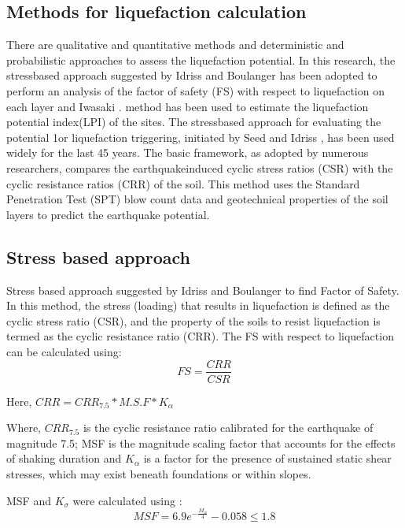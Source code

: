 \subsection{Methods for liquefaction calculation}
There are qualitative and quantitative methods and deterministic and probabilistic approaches to assess the liquefaction potential. In this research, the stress\-based approach suggested by Idriss and Boulanger\cite{idris_and_bolinger} has been adopted to perform an analysis of the factor of safety (FS) with respect to liquefaction on each layer and Iwasaki . \cite{r26} method has been used to estimate the liquefaction potential index(LPI) of the sites.
The stress\-based approach for evaluating the potential 1\-or liquefaction triggering, initiated by Seed and Idriss \cite{idris_seed}, has been used widely for the last 45 years. The basic framework, as adopted by numerous researchers, compares the earthquake\-induced cyclic stress ratios (CSR) with the cyclic resistance ratios (CRR) of the soil. This method uses the Standard Penetration Test (SPT) blow count data and geotechnical properties of the soil layers to predict the earthquake potential.
\subsection{Stress based approach}
Stress based approach suggested by Idriss and Boulanger \cite{idris_and_bolinger} to find Factor of Safety. In this method, the stress (loading) that results in liquefaction is defined as the cyclic stress ratio (CSR), and the property of the soils to resist liquefaction is termed as the cyclic resistance ratio (CRR). The FS with respect to liquefaction can be calculated using:
\begin{equation}
FS = \frac{CRR}{CSR}
\end{equation}

Here, $CRR = CRR_{7.5}*M.S.F*K_\alpha $

Where, $CRR_{7.5}$ is the cyclic resistance ratio calibrated for the earthquake of magnitude 7.5; MSF is the magnitude scaling factor that accounts for the effects of shaking duration and $K_\alpha$ is a factor for the presence of sustained static shear stresses, which may exist beneath foundations or within slopes.

MSF and $K_\sigma$ were calculated using \cite{idris_and_bolinger}: 
\begin{equation}
MSF = 6.9 e^{- \frac{M_w}{4}} - 0.058 \leq 1.8
\end{equation}


